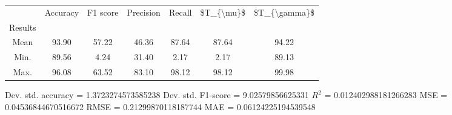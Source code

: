 \begin{tabular}{|c|c|c|c|c|c|c|}
\toprule
{} &  Accuracy &  F1 score &  Precision &  Recall &  \$T\_\{\textbackslash mu\}\$ &  \$T\_\{\textbackslash gamma\}\$ \\
Results &           &           &            &         &            &               \\
\hline
Mean    &     93.90 &     57.22 &      46.36 &   87.64 &      87.64 &         94.22 \\
Min.    &     89.56 &      4.24 &      31.40 &    2.17 &       2.17 &         89.13 \\
Max.    &     96.08 &     63.52 &      83.10 &   98.12 &      98.12 &         99.98 \\
\bottomrule
\end{tabular}

 Dev. std. accuracy = 1.3723274573585238
 Dev. std. F1-score = 9.02579856625331
 $R^2$ = 0.012402988181266283
 MSE = 0.04536844670516672
 RMSE = 0.21299870118187744
 MAE = 0.06124225194539548
